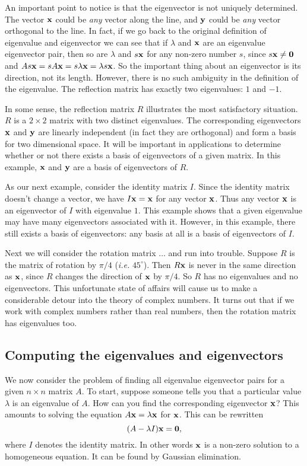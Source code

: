 An important point to notice is that the eigenvector is not uniquely
determined.  The vector ${\bf x}$ could be {\it any} vector along the
line, and ${\bf y}$ could be {\it any} vector orthogonal to the line. In
fact, if we go back to the original definition of eigenvalue and
eigenvector we can see that if $\lambda$ and ${\bf x}$ are an eigenvalue
eigenvector pair, then so are $\lambda$ and $s{\bf x}$ for any non-zero
number $s$, since $s{\bf x}\ne{\bf 0}$ and $As{\bf x}=sA{\bf x}=s\lambda {\bf x} =\lambda
s{\bf x}$. So the important thing about an eigenvector is its direction,
not its length. However, there is no such ambiguity in the definition
of the eigenvalue. The reflection matrix has exactly two eigenvalues:
$1$ and $-1$.

In some sense, the reflection matrix $R$ illustrates the most
satisfactory situation. $R$ is a $2\times 2$ matrix with two distinct
eigenvalues. The corresponding eigenvectors ${\bf x}$ and ${\bf y}$ are
linearly independent (in fact they are orthogonal) and form a basis
for two dimensional space.  It will be important in applications to
determine whether or not there exists a basis of eigenvectors of a
given matrix. In this example, ${\bf x}$ and ${\bf y}$ are a basis of
eigenvectors of $R$.

As our next example, consider the identity matrix $I$. Since the
identity matrix doesn't change a vector, we have $I{\bf x}={\bf x}$ for any
vector ${\bf x}$.  Thus any vector ${\bf x}$ is an eigenvector of $I$ with
eigenvalue $1$.  This example shows that a given eigenvalue may have
many eigenvectors associated with it. However, in this example, there
still exists a basis of eigenvectors: any basis at all is a basis of
eigenvectors of $I$.

Next we will consider the rotation matrix $\ldots$ and run into
trouble. Suppose $R$ is the matrix of rotation by $\pi/4$ ({\em i.e.}
$45^\circ$). Then $R{\bf x}$ is never in the same direction as ${\bf x}$,
since $R$ changes the direction of ${\bf x}$ by $\pi/4$. So $R$ has no
eigenvalues and no eigenvectors. This unfortunate state of affairs
will cause us to make a considerable detour into the theory of complex
numbers. It turns out that if we work with complex numbers rather than
real numbers, then the rotation matrix has eigenvalues too.

\subsection{Computing the eigenvalues and eigenvectors}

We now consider the problem of finding all eigenvalue eigenvector
pairs for a given $n\times n$ matrix $A$. To start, suppose someone
tells you that a particular value $\lambda$ is an eigenvalue of
$A$. How can you find the corresponding eigenvector ${\bf x}$?  This
amounts to solving the equation $A{\bf x}=\lambda{\bf x}$ for ${\bf x}$. This can
be rewritten
\[
(A-\lambda I){\bf x} = {\bf 0},
\]
where $I$ denotes the identity matrix. In other words ${\bf x}$ is a
non-zero solution to a homogeneous equation. It can be found by
Gaussian elimination.

